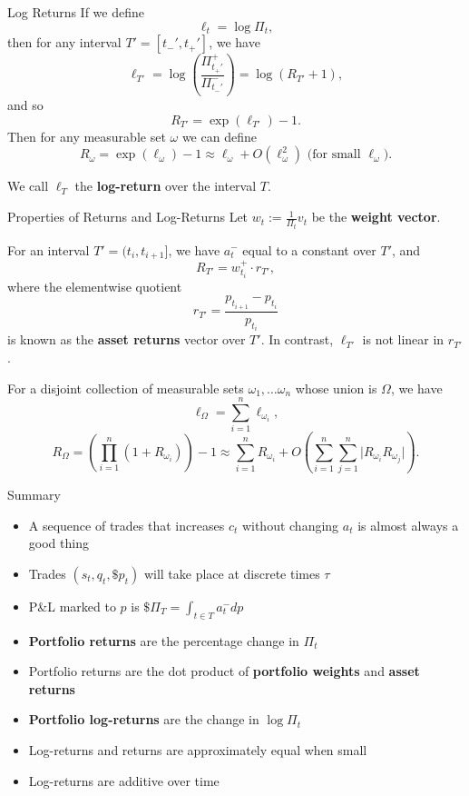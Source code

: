 \documentclass{beamer}
\begin{document}
\begin{frame}{Log Returns}
	If we define
	$$\ell_t = \log \Pi_t,$$ %
	then for any interval $T'=[t_-',t_+']$, we have
	$$\ell_{T'} = \log\left(\frac{\Pi_{t_+'}^+}{\Pi_{t_-'}^-}\right)= \log(R_{T'}+1),$$
	and so
	$$R_{T'} = \exp(\ell_{T'}) - 1.$$
	Then for any measurable set $\omega$ we can define
	$$R_\omega = \exp(\ell_\omega) - 1 \approx \ell_\omega + O(\ell_\omega^2)\textrm{ (for small }\ell_\omega\textrm{)}.$$

	We call $\ell_T$ the \textbf{log-return} over the interval $T$.
\end{frame}

\begin{frame}{Properties of Returns and Log-Returns}
	Let $w_t := \frac{1}{\Pi_t}v_t$ be the \textbf{weight vector}.%

	For an interval $T' = (t_i,t_{i+1}]$, we have $a_t^-$ equal to a constant over $T'$, and
	$$R_{T'} = w_{t_i}^+ \cdot r_{T'},$$
	where the elementwise quotient
	$$r_{T'} = \frac{p_{t_{i+1}} - p_{t_i}}{p_{t_i}}$$
	is known as the \textbf{asset returns} vector over $T'$. In contrast, $\ell_{T'}$ is not linear in $r_{T'}$. %

	For a disjoint collection of measurable sets $\omega_1,\ldots\omega_n$ whose union is $\Omega$, we have
	$$\ell_\Omega = \sum_{i=1}^n \ell_{\omega_i},$$
	$$R_\Omega = \left(\prod_{i=1}^n (1+R_{\omega_i})\right) - 1 \approx \sum_{i=1}^n R_{\omega_i} + O\left(\sum_{i=1}^n\sum_{j=1}^n \vert R_{\omega_i} R_{\omega_j} \vert\right).$$
\end{frame}

\begin{frame}{Summary}
	\begin{itemize}
		\item A sequence of trades that increases $c_t$ without changing $a_t$ is almost always a good thing
		\item Trades $(s_t,q_t,\$p_t)$ will take place at discrete times $\tau$
		\item P\&L marked to $p$ is $\$\Pi_T = \int_{t\in T}a_t^-dp$
		\item \textbf{Portfolio returns} are the percentage change in $\Pi_t$
		\item Portfolio returns are the dot product of \textbf{portfolio weights} and \textbf{asset returns}
		\item \textbf{Portfolio log-returns} are the change in $\log\Pi_t$
		\item Log-returns and returns are approximately equal when small
		\item Log-returns are additive over time
	\end{itemize}
\end{frame}
\end{document}
